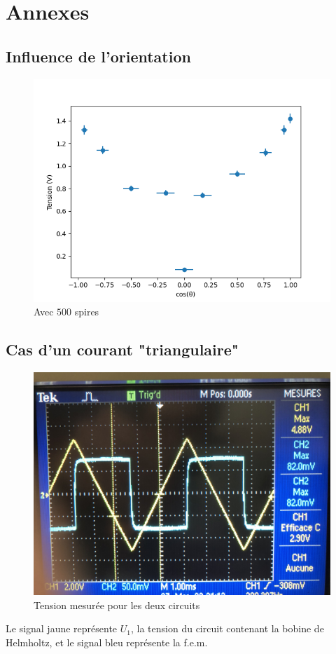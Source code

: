 \documentclass[11pt]{article}
\begin{document}
\break
\section*{Annexes}
\subsection{Influence de l'orientation}
\begin{figure}[h!]
  \centering
  \includegraphics[width=.5\linewidth]{img/Graph_Angle.png}
  \caption{Avec $500$ spires}
  \label{fig:graphe_angle}
\end{figure}


\subsection{Cas d'un courant "triangulaire"}
\begin{figure}[h!]
  \centering
  \includegraphics[width=.5\linewidth]{img/oscillo.png}
  \caption{Tension mesurée pour les deux circuits}
  \label{fig:oscillo}
\end{figure}

Le signal jaune représente $U_1$, la tension du circuit contenant la bobine de Helmholtz, et le signal bleu représente la f.e.m.
\end{document}
